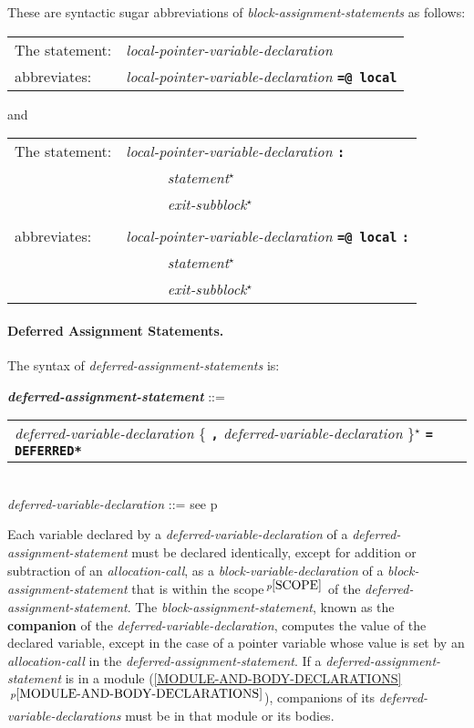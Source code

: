 \documentclass[12pt]{article}
\newcommand{\subsubsubsection}[1]{\paragraph[#1]{#1.}}
\newcommand{\TT}[1]{{\tt \bfseries #1}}
\newcommand{\STAR}{{\Large $^\star$}}
\newcommand{\key}[1]{{\rm \bfseries #1}}
\newcommand{\ttkey}[1]{{\tt \bfseries #1}}
\newcommand{\emkey}[1]{{\em \bfseries #1}}
\newcommand{\itemref}[1]{\ref{#1}$\,^{p\pageref{#1}}$}
\newcommand{\pagref}[1]{p\pageref{#1}}
\newcommand{\pagnote}[1]{$\,^{p\pageref{#1}}$}
\newenvironment{indpar}[1][0.3in]%
	{\begin{list}{}%
		     {\setlength{\itemsep}{0in}%
		      \setlength{\topsep}{0in}%
		      \setlength{\parsep}{1ex}%
		      \setlength{\labelwidth}{#1}%
		      \setlength{\leftmargin}{#1}%
		      \addtolength{\leftmargin}{\labelsep}}%
	 \item}%
	{\end{list}}
\begin{document}
These are syntactic
sugar abbreviations of {\em block-assignment-statements} as
follows:

\hspace*{0.5in}\begin{tabular}{@{}l@{~~~~}l}
The statement: & {\em local-pointer-variable-declaration}
\\[0.5ex]
abbreviates:   & {\em local-pointer-variable-declaration} \TT{=@ local}
\end{tabular}

and

\hspace*{0.5in}\begin{tabular}{@{}l@{~~~~}l}
The statement: & {\em local-pointer-variable-declaration} \TT{:} \\
        & ~~~~~ {\em statement}\STAR{} \\
        & ~~~~~ {\em exit-subblock}\STAR{} \\
\\[0.5ex]
abbreviates:   & {\em local-pointer-variable-declaration} \TT{=@ local}
                 \TT{:} \\
        & ~~~~~ {\em statement}\STAR{} \\
        & ~~~~~ {\em exit-subblock}\STAR{} \\
\end{tabular}

\subsubsubsection{Deferred Assignment Statements}
\label{DEFERRED-ASSIGNMENT-STATEMENTS}

The syntax of {\em defer\-red-assignment-state\-ments} is:

\begin{indpar}
\emkey{deferred-assignment-statement} ::= \\
\hspace*{0.3in}
    \begin{tabular}[t]{@{}l}
        {\em deferred-variable-declaration}
                \{ \TT{,} {\em deferred-variable-declaration} \}\STAR{}
		     \TT{=} \ttkey{*DEFERRED*} \\
    \end{tabular}
\\[0.5ex]
{\em deferred-variable-declaration} ::=
    see \pagref{DEFERRED-VARIABLE-DECLARATION}
\end{indpar}

Each variable declared by a {\em deferred-variable-declaration}
of a {\em deferred-assignment-statement} must be declared identically,
except for addition or subtraction of an {\em allocation-call},
as a {\em block-variable-declaration} of a {\em block-assignment-statement}
that is within the scope\pagnote{SCOPE} of the
{\em deferred-assignment-statement}.  The {\em block-assignment-statement},
known as the \key{companion} of the {\em deferred-variable-declaration},
computes the value of the
declared variable, except in the case of a pointer variable whose value is
set by an {\em allocation-call} in the {\em deferred-assignment-statement}.
If a {\em deferred-assignment-statement} is in a module
(\itemref{MODULE-AND-BODY-DECLARATIONS}), companions
of its {\em deferred-variable-declarations}
must be in that module or its bodies.
\end{document}
